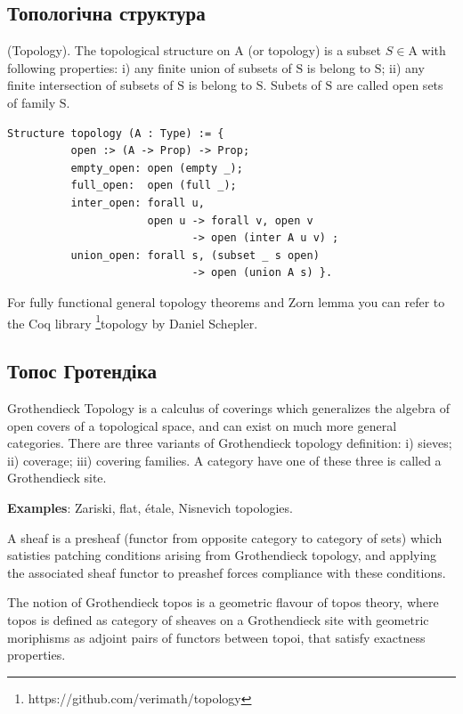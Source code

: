 \subsection{Топологічна структура}

\begin{definition} (Topology). The topological structure on $\mathrm{A}$
(or topology) is a subset $S \in \mathrm{A}$ with following properties:
i) any finite union of subsets of $\mathrm{S}$ is belong to $\mathrm{S}$;
ii) any finite intersection of subsets of $\mathrm{S}$ is belong to $\mathrm{S}$.
Subets of $\mathrm{S}$ are called open sets of family $\mathrm{S}$.
\begin{lstlisting}
Structure topology (A : Type) := {
          open :> (A -> Prop) -> Prop;
          empty_open: open (empty _);
          full_open:  open (full _);
          inter_open: forall u,
                      open u -> forall v, open v
                             -> open (inter A u v) ;
          union_open: forall s, (subset _ s open)
                             -> open (union A s) }.
\end{lstlisting}
For fully functional general topology theorems and Zorn lemma you can refer to
the Coq library \footnote{https://github.com/verimath/topology}{topology} by Daniel Schepler.
\end{definition}

\subsection{Топос Гротендіка}

Grothendieck Topology is a calculus of coverings which generalizes the algebra
of open covers of a topological space, and can exist on much more general categories.
There are three variants of Grothendieck topology definition:
i) sieves; ii) coverage; iii) covering families.
A category have one of these three is called a Grothendieck site.

{\bf Examples}: Zariski, flat, étale, Nisnevich topologies.

A sheaf is a presheaf (functor from opposite category to category of sets) which
satisties patching conditions arising from Grothendieck topology, and applying
the associated sheaf functor to preashef forces compliance with these conditions.

The notion of Grothendieck topos is a geometric flavour of topos theory,
where topos is defined as category of sheaves on a Grothendieck site with
geometric moriphisms as adjoint pairs of functors between topoi, that
satisfy exactness properties. \cite{Jardine15}

